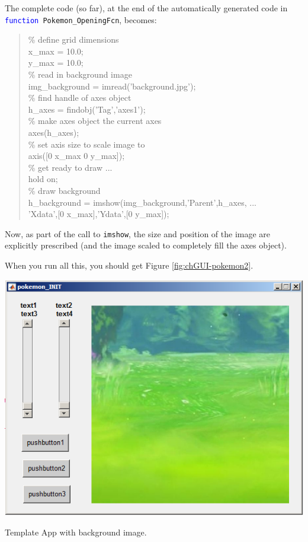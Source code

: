 \documentclass{tufte-book} %
\newenvironment{docspec}{\begin{quotation}\ttfamily\parskip0pt\parindent0pt\ignorespaces}{\end{quotation}}
\begin{document}
The complete code (so far), at the end of the automatically generated code in \texttt{\textcolor{blue}{function} Pokemon\_OpeningFcn}, becomes:
\begin{docspec}
\textcolor[rgb]{0,0.501961,0}{\% define grid dimensions}
\\x\_max = 10.0;
\\y\_max = 10.0;
\\\textcolor[rgb]{0,0.501961,0}{\% read in background image}
\\img\_background = imread(\textcolor[rgb]{0.501961,0,1}{'background.jpg'});\\
\textcolor[rgb]{0,0.501961,0}{\% find handle of axes object}\\
h\_axes = findobj('Tag','axes1');
\\\textcolor[rgb]{0,0.501961,0}{\% make axes object the current axes}
\\axes(h\_axes);
\\\textcolor[rgb]{0,0.501961,0}{\% set axis size to scale image to}\\
axis([0 x\_max 0 y\_max]);
\\\textcolor[rgb]{0,0.501961,0}{\% get ready to draw ...}
\\hold \textcolor[rgb]{0.501961,0,1}{on};
\\\textcolor[rgb]{0,0.501961,0}{\% draw background}
\\h\_background = imshow(img\_background,\textcolor[rgb]{0.501961,0,1}{'Parent'},h\_axes, ...
\\'Xdata',[0 x\_max],'Ydata',[0 y\_max]);
\end{docspec}
Now, as part of the call to \texttt{imshow}, the size and position of the image are explicitly prescribed (and the image scaled to completely fill the \textsf{axes} object).

When you run all this, you should get Figure \ref{fig:chGUI-pokemon2}. 

\begin{marginfigure}[0.0in]
\includegraphics[width=\linewidth]{chGUI-pokemon2.png}
\caption{Template App with background image.}
\label{fig:chGUI-pokemon2}
\end{marginfigure}
\end{document}
